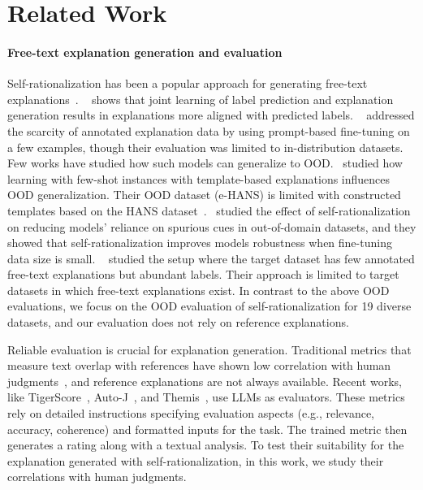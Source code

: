 \section{Related Work}
\paragraph{Free-text explanation generation and evaluation}
Self-rationalization has been a popular approach for generating free-text explanations~\cite{wiegreffe2021measuring,marasovic2022few,ross2022self,veerubhotla2023shot,ramnath2024tailoring}. ~\citet{wiegreffe2021measuring} shows that joint learning of label prediction and explanation generation results in explanations more aligned with predicted labels. ~\citet{marasovic2022few} addressed the scarcity of annotated explanation data by using prompt-based fine-tuning on a few examples, though their evaluation was limited to in-distribution datasets. Few works have studied how such models can generalize to OOD.~\citet{zhou2021investigating} studied how learning with few-shot instances with template-based explanations influences OOD generalization. Their OOD dataset (e-HANS) is limited with constructed templates based on the HANS dataset~\cite{mccoy2019right}.~\citet{ross2022self} studied the effect of self-rationalization on reducing models' reliance on spurious cues in out-of-domain datasets, and they showed that self-rationalization improves models robustness when fine-tuning data size is small. ~\citet{yordano2022few} studied the setup where the target dataset has few annotated free-text explanations but abundant labels. Their approach is limited to target datasets in which free-text explanations exist. In contrast to the above OOD evaluations, we focus on the OOD evaluation of self-rationalization for 19 diverse datasets, and our evaluation does not rely on reference explanations.

Reliable evaluation is crucial for explanation generation. Traditional metrics that measure text overlap with references have shown low correlation with human judgments~\cite{sulem2018bleu}, and reference explanations are not always available. Recent works, like TigerScore~\cite{jiang2023tigerscore}, Auto-J~\cite{li2024generative}, and Themis~\cite{hu2024themis}, use LLMs as evaluators. These metrics rely on detailed instructions specifying evaluation aspects (e.g., relevance, accuracy, coherence) and formatted inputs for the task. The trained metric then generates a rating along with a textual analysis.
To test their suitability for the explanation generated with self-rationalization, in this work, we study their correlations with human judgments.


